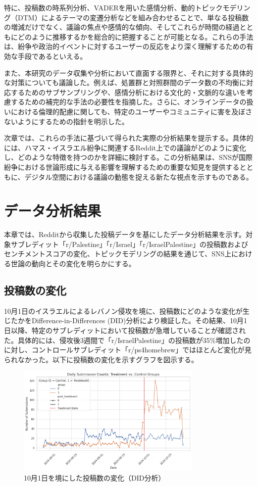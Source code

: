 \documentclass[11pt, a4j]{jreport}
\begin{document}
    特に、投稿数の時系列分析、VADERを用いた感情分析、動的トピックモデリング（DTM）によるテーマの変遷分析などを組み合わせることで、単なる投稿数の増減だけでなく、議論の焦点や感情的な傾向、そしてこれらが時間の経過とともにどのように推移するかを総合的に把握することが可能となる。これらの手法は、紛争や政治的イベントに対するユーザーの反応をより深く理解するための有効な手段であるといえる。

    また、本研究のデータ収集や分析において直面する限界と、それに対する具体的な対策についても議論した。例えば、処置群と対照群間のデータ数の不均衡に対応するためのサブサンプリングや、感情分析における文化的・文脈的な違いを考慮するための補完的な手法の必要性を指摘した。さらに、オンラインデータの扱いにおける倫理的配慮に関しても、特定のユーザーやコミュニティに害を及ぼさないようにするための指針を明示した。

    次章では、これらの手法に基づいて得られた実際の分析結果を提示する。具体的には、ハマス・イスラエル紛争に関連するReddit上での議論がどのように変化し、どのような特徴を持つのかを詳細に検討する。この分析結果は、SNSが国際紛争における世論形成に与える影響を理解するための重要な知見を提供するとともに、デジタル空間における議論の動態を捉える新たな視点を示すものである。    

    \chapter{データ分析結果}
    本章では、Redditから収集した投稿データを基にしたデータ分析結果を示す。対象サブレディット「r/Palestine」「r/Israel」「r/IsraelPalestine」の投稿数およびセンチメントスコアの変化、トピックモデリングの結果を通じて、SNS上における世論の動向とその変化を明らかにする。

    \section{投稿数の変化}
    10月1日のイスラエルによるレバノン侵攻を境に、投稿数にどのような変化が生じたかをDifference-in-Differences (DID)分析により検証した。その結果、10月1日以降、特定のサブレディットにおいて投稿数が急増していることが確認された。具体的には、侵攻後3週間で「r/IsraelPalestine」の投稿数が35\%増加したのに対し、コントロールサブレディット「r/ps4homebrew」ではほとんど変化が見られなかった。以下に投稿数の変化を示すグラフを図示する。

    \begin{figure}[H]
        \centering
        \includegraphics[width=0.8\textwidth]{submission_count_plot.png}
        \caption{10月1日を境にした投稿数の変化（DID分析）}
    \end{figure}
\end{document}
